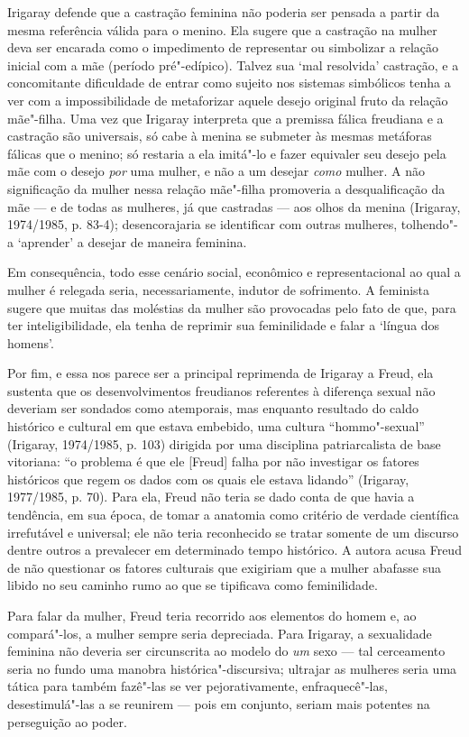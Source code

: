 Irigaray defende que a castração feminina não poderia ser pensada a
partir da mesma referência válida para o menino. Ela sugere que a
castração na mulher deva ser encarada como o impedimento de representar
ou simbolizar a relação inicial com a mãe (período pré"-edípico). Talvez
sua `mal resolvida' castração, e a concomitante dificuldade de entrar
como sujeito nos sistemas simbólicos tenha a ver com a impossibilidade
de metaforizar aquele desejo original fruto da relação mãe"-filha. Uma
vez que Irigaray interpreta que a premissa fálica freudiana e a
castração são universais, só cabe à menina se submeter às mesmas
metáforas fálicas que o menino; só restaria a ela imitá"-lo e fazer
equivaler seu desejo pela mãe com o desejo \emph{por} uma mulher, e não
a um desejar \emph{como} mulher. A não significação da mulher nessa
relação mãe"-filha promoveria a desqualificação da mãe --- e de todas as
mulheres, já que castradas --- aos olhos da menina (Irigaray, 1974/1985,
p. 83-4); desencorajaria se identificar com outras mulheres, tolhendo"-a
`aprender' a desejar de maneira feminina.

Em consequência, todo esse cenário social, econômico e representacional
ao qual a mulher é relegada seria, necessariamente, indutor de
sofrimento. A feminista sugere que muitas das moléstias da mulher são
provocadas pelo fato de que, para ter inteligibilidade, ela tenha de
reprimir sua feminilidade e falar a `língua dos homens'.

Por fim, e essa nos parece ser a principal reprimenda de Irigaray a
Freud, ela sustenta que os desenvolvimentos freudianos referentes à
diferença sexual não deveriam ser sondados como atemporais, mas enquanto
resultado do caldo histórico e cultural em que estava embebido, uma
cultura ``hommo"-sexual'' (Irigaray, 1974/1985, p. 103) dirigida por uma
disciplina patriarcalista de base vitoriana: ``o problema é que ele
{[}Freud{]} falha por não investigar os fatores históricos que regem os
dados com os quais ele estava lidando'' (Irigaray, 1977/1985, p. 70).
Para ela, Freud não teria se dado conta de que havia a tendência, em sua
época, de tomar a anatomia como critério de verdade científica
irrefutável e universal; ele não teria reconhecido se tratar somente de
um discurso dentre outros a prevalecer em determinado tempo histórico. A
autora acusa Freud de não questionar os fatores culturais que exigiriam
que a mulher abafasse sua libido no seu caminho rumo ao que se
tipificava como feminilidade.

Para falar da mulher, Freud teria recorrido aos elementos do homem e, ao
compará"-los, a mulher sempre seria depreciada. Para Irigaray, a
sexualidade feminina não deveria ser circunscrita ao modelo do \emph{um}
sexo --- tal cerceamento seria no fundo uma manobra histórica"-discursiva;
ultrajar as mulheres seria uma tática para também fazê"-las se ver
pejorativamente, enfraquecê"-las, desestimulá"-las a se reunirem --- pois
em conjunto, seriam mais potentes na perseguição ao poder.

